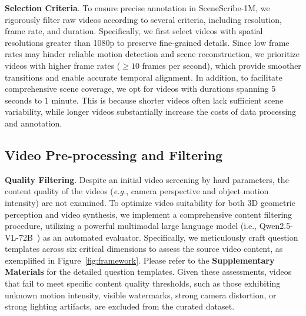 \noindent\textbf{Selection Criteria}. 
To ensure precise annotation in SceneScribe-1M, we rigorously filter raw videos according to several criteria, including resolution, frame rate, and duration.
Specifically, we first select videos with spatial resolutions greater than 1080p to preserve fine-grained details.
Since low frame rates may hinder reliable motion detection and scene reconstruction, we prioritize videos with higher frame rates ($\geq10$ frames per second), which provide smoother transitions and enable accurate temporal alignment.
In addition, to facilitate comprehensive scene coverage, we opt for videos with durations spanning 5 seconds to 1 minute.
This is because shorter videos often lack sufficient scene variability, while longer videos substantially increase the costs of data processing and annotation.








\subsection{Video Pre-processing and Filtering}
\label{sec:s2}
\noindent\textbf{Quality Filtering}.
Despite an initial video screening by hard parameters, the content quality of the videos (\textit{e.g.}, camera perspective and object motion intensity) are not examined.
To optimize video suitability for both 3D geometric perception and video synthesis, we implement a comprehensive content filtering procedure, utilizing a powerful multimodal large language model (i.e., Qwen2.5-VL-72B~\cite{bai2025qwen2}) as an automated evaluator.
Specifically, we meticulously craft question templates across six critical dimensions to assess the source video content, as exemplified in Figure~\ref{fig:framework}.
Please refer to the \textbf{Supplementary Materials} for the detailed question templates.
Given these assessments, videos that fail to meet specific content quality thresholds, such as those exhibiting unknown motion intensity, visible watermarks, strong camera distortion,  or strong lighting artifacts, are excluded from the curated dataset. 



